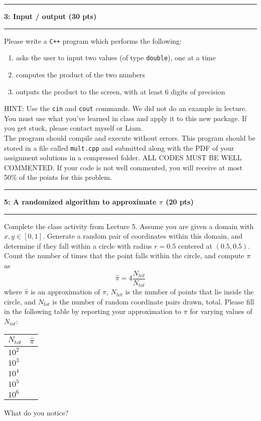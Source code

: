 \documentclass[11pt]{article}
\newcommand\question[2]{\vspace{.25in}\hrule\textbf{#1: #2}\vspace{.5em}\hrule\vspace{.10in}}
\begin{document}
\newpage
\question{3}{Input / output (30 pts)}
Please write a \texttt{C++} program which performs the following:
\begin{enumerate}
    \item asks the user to input two values (of type \texttt{double}), one at a
        time
    \item computes the product of the two numbers
    \item outputs the product to the screen, with at least 6 digits of
        precision
\end{enumerate}
HINT: Use the \texttt{cin} and \texttt{cout} commands. We did not do an example in lecture. You must use what you've learned in class and apply it to this new package. If you get stuck, please contact myself or Liam. \\
\vspace{8pt} 
The program should compile and execute without errors. This program
should be stored in a file called \texttt{mult.cpp} and submitted along with the PDF of your assignment solutions in a compressed folder. ALL CODES MUST BE WELL COMMENTED. If your code is not well commented, you will receive at most 50\% of the points for this problem.
\vspace{1cm}
\question{5}{A randomized algorithm to approximate $\pi$ (20 pts)}
Complete the class activity from Lecture 5. Assume you are given a domain with $x, y
\in \left[0,1\right]$. Generate a random pair of coordinates within this domain,
and determine if they fall within a circle with radius $r = 0.5$ centered at
$(0.5,0.5)$. Count the number of times that the point falls within the circle,
and compute $\pi$ as
\begin{equation*}
    \hat{\pi} = 4 \frac{N_{hit}}{N_{tot}}
\end{equation*}
where $\hat{\pi}$ is an approximation of $\pi$, $N_{hit}$ is the number of points that lie inside the circle, and
$N_{tot}$ is the number of random coordinate pairs drawn, total. Please fill in
the following table by reporting your approximation to $\pi$ for varying values
of $N_{tot}$:
\vspace{0.5cm}
\begin{table}[H]
    \center
    \begin{tabular}{|l|l|}
    \hline
        $N_{tot}$ & \quad \text{ } $\hat{\pi}$ \\ \hline
    $10^2$    & \quad \quad \quad \quad \quad \\ \hline
    $10^{3}$  &             \\ \hline
    $10^{4}$  &             \\ \hline
    $10^{5}$  &				\\ \hline
    $10^{6}$  &				\\ \hline
    \end{tabular}
\end{table}
What do you notice?
\end{document}

